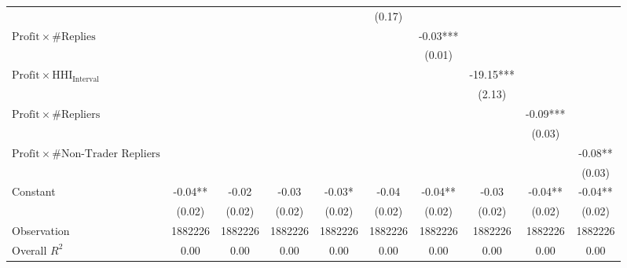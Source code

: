 \begin{tabular}{lccccccccc}
&  &  &  &  & (0.17) &  &  &  &  \\
$\text{Profit} \times \#\text{Replies}$&  &  &  &  &  & -0.03*** &  &  &  \\
&  &  &  &  &  & (0.01) &  &  &  \\
$\text{Profit} \times \text{HHI}_{\text{Interval}}$&  &  &  &  &  &  & -19.15*** &  &  \\
&  &  &  &  &  &  & (2.13) &  &  \\
$\text{Profit} \times \#\text{Repliers}$&  &  &  &  &  &  &  & -0.09*** &  \\
&  &  &  &  &  &  &  & (0.03) &  \\
$\text{Profit} \times \#\text{Non-Trader Repliers}$&  &  &  &  &  &  &  &  & -0.08** \\
&  &  &  &  &  &  &  &  & (0.03) \\
Constant& -0.04** & -0.02 & -0.03 & -0.03* & -0.04 & -0.04** & -0.03 & -0.04** & -0.04** \\
& (0.02) & (0.02) & (0.02) & (0.02) & (0.02) & (0.02) & (0.02) & (0.02) & (0.02) \\
Observation& 1882226 & 1882226 & 1882226 & 1882226 & 1882226 & 1882226 & 1882226 & 1882226 & 1882226 \\
Overall $R^2$& 0.00 & 0.00 & 0.00 & 0.00 & 0.00 & 0.00 & 0.00 & 0.00 & 0.00 \\
\hline
\end{tabular}
